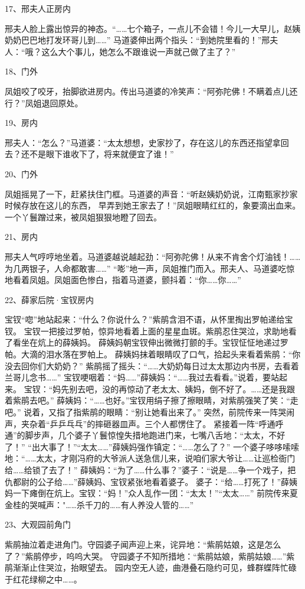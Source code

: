 17、邢夫人正房内\par
邢夫人脸上露出惊异的神态。“……七个箱子，一点儿不会错！今儿一大早儿，赵姨奶奶巴巴地打发环哥儿到……”
马道婆伸出两个指头：“到她院里看的！”邢夫人：“哦？这么大个事儿，她怎么不跟谁说一声就己做了主了？” 

18、门外\par
凤姐咬了咬牙，抬脚欲进房内。传出马道婆的冷笑声：“阿弥陀佛！不瞒着点儿还行？”凤姐退回原处。 

19、房内\par 
邢夫人：“怎么？”马道婆：“太太想想，史家抄了，存在这儿的东西还指望拿回去？还不是眼下谁收下了，将来就便宜了谁！”

20、门外\par
凤姐摇晃了一下，赶紧扶住门框。马道婆的声音：“听赵姨奶奶说，江南甄家抄家时候存放在这儿的东西，
早弄到她王家去了！”凤姐眼睛红红的，象要滴出血来。一个丫鬟蹭过来，被凤姐狠狠地瞪了回去。

21、房内\par
邢夫人气哼哼地坐着。马道婆越说越起劲：“阿弥陀佛！从来不肯舍个灯油钱！……为几两银子，人命都敢害……”
“嘭”地一声，凤姐推门而入。邢夫人、马道婆吃惊地看着凤姐。凤姐面色惨白，指着马道婆，颤抖着：“你……你……” 

22、薛家后院·宝钗房内\par
宝钗“唿”地站起来：“什么？你说什么？”紫鹃含泪不语，从怀里掏出罗帕递给宝钗。
宝钗一把接过罗帕，惊异地看着上面的星星血斑。紫鹃忍住哭泣，求助地看了看坐在炕上的薛姨妈。 
薛姨妈朝宝钗伸出微微打颤的手。宝钗怔怔地递过罗帕。大滴的泪水落在罗帕上。 
薛姨妈抹着眼睛叹了口气，拾起头来看着紫鹃：“你没去回你们大奶奶？” 
紫鹃摇了摇头：“……大奶奶每日过太太那边内书房，去看着兰哥儿念书……” 
宝钗哽咽着：“妈……”薛姨妈：“……我过去看看。”说着，要站起来。 
宝钗：“妈先别去吧，没的再惊动了老太太、姨妈，倒不好了。……还是我跟着紫鹃去吧。” 
薛姨妈：“……也好。”宝钗用绢子擦了擦眼睛，对紫鹃强笑了笑：“走吧。”
说着，又指了指紫鹃的眼睛：“别让她看出来了。” 
突然，前院传来一阵哭闹声，夹杂着“乒乒乓乓”的摔砸器皿声。三个人都愣住了。 
紧接着一阵“呼通呼通”的脚步声，几个婆子丫鬟惊惶失措地跑进门来，七嘴八舌地：“太太，不好了！” 
“出大事了！”“太太……”薛姨妈强作镇定：“……怎么了？” 
一个婆子哆哆嗦嗦地：“……太太，才刚冯府的大爷派人送急信儿来，说咱们家大爷让……让巡检衙门给……给锁了去了！” 
薛姨妈：“为了……什么事？”婆子：“说是……争一个戏子，把仇都尉的公子给……”薛姨妈、宝钗紧张地看着婆子。 
婆子：“给……打死了！”薛姨妈一下瘫倒在炕上。宝钗：“妈！”众人乱作一团：“太太！”“太太……”
前院传来夏金桂的哭喊声："……杀千刀的……有人养没人管的……” 

23、大观园前角门\par
紫鹃抽泣着走进角门。守园婆子闻声迎上来，诧异地：“紫鹃姑娘，这是怎么了？”紫鹃停步，呜呜大哭。 
守园婆子不知所措地：“紫鹃姑娘，紫鹃姑娘……”紫鹃渐渐止住哭泣，抬眼望去。 
园内空无人迹，曲港叠石隐约可见，蜂群蝶阵忙碌于红花绿柳之中……。 

